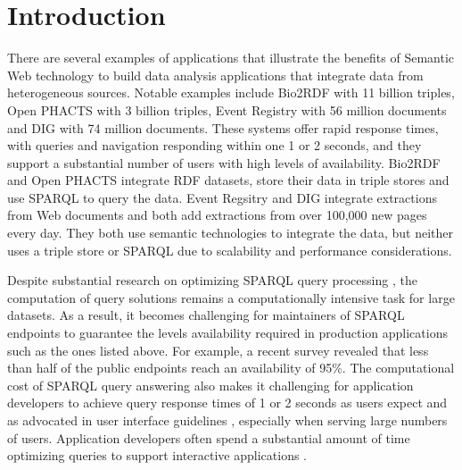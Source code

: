 \section{Introduction}
There are several examples of applications that illustrate the benefits of Semantic Web technology to build data analysis applications that integrate data from heterogeneous sources.
Notable examples include Bio2RDF \cite{callahan2013bio2rdf} with 11 billion triples, Open PHACTS \cite{Groth_Loizou_Gray_Goble_Harland_Pettifer_2014} with 3 billion triples, Event Registry \cite{Leban_Fortuna_Brank_Grobelnik_2014} with 56 million documents and DIG \cite{szekely2015building} with 74 million documents.
These systems offer rapid response times, with queries and navigation responding within one 1 or 2 seconds, and they support a substantial number of users with high levels of availability.
Bio2RDF and Open PHACTS integrate RDF datasets, store their data in triple stores and use SPARQL to query the data.
Event Regsitry and DIG integrate extractions from Web documents and both add extractions from over 100,000 new pages every day.
They both use semantic technologies to integrate the data, but neither uses a triple store or SPARQL due to scalability and performance considerations.

Despite substantial research on optimizing SPARQL query processing \cite{Pham2013}, the computation of query solutions remains a computationally intensive task for large datasets.
As a result, it becomes challenging for maintainers of SPARQL endpoints to guarantee the levels availability required in production applications such as the ones listed above.
For example, a recent survey \cite{buil2013sparql} revealed that less than half of the public endpoints reach an availability of 95\%.
The computational cost of SPARQL query answering also makes it challenging for application developers to achieve query response times of 1 or 2 seconds as users expect and as advocated in user interface guidelines \cite{nielsen1994usability}, especially when serving large numbers of users.
Application developers often spend a substantial amount of time optimizing queries to support interactive applications \cite{Loizou_Angles_Groth_2014}.

